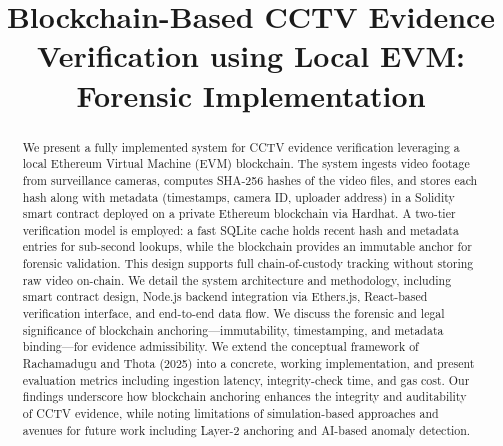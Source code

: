 \documentclass[conference]{IEEEtran}
\begin{document}
\title{Blockchain-Based CCTV Evidence Verification using Local EVM: Forensic Implementation}

\author{
\and
{}
}

\maketitle

\begin{abstract}
We present a fully implemented system for CCTV evidence verification leveraging a local Ethereum Virtual Machine (EVM) blockchain. The system ingests video footage from surveillance cameras, computes SHA-256 hashes of the video files, and stores each hash along with metadata (timestamps, camera ID, uploader address) in a Solidity smart contract deployed on a private Ethereum blockchain via Hardhat. A two-tier verification model is employed: a fast SQLite cache holds recent hash and metadata entries for sub-second lookups, while the blockchain provides an immutable anchor for forensic validation. This design supports full chain-of-custody tracking without storing raw video on-chain. We detail the system architecture and methodology, including smart contract design, Node.js backend integration via Ethers.js, React-based verification interface, and end-to-end data flow. We discuss the forensic and legal significance of blockchain anchoring---immutability, timestamping, and metadata binding---for evidence admissibility. We extend the conceptual framework of Rachamadugu and Thota (2025) into a concrete, working implementation, and present evaluation metrics including ingestion latency, integrity-check time, and gas cost. Our findings underscore how blockchain anchoring enhances the integrity and auditability of CCTV evidence, while noting limitations of simulation-based approaches and avenues for future work including Layer-2 anchoring and AI-based anomaly detection.
\end{abstract}
\end{document}
